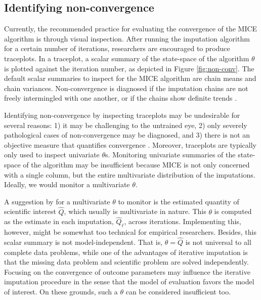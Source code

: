 \documentclass[Royal,times,sageh]{sagej}
\begin{document}
\hypertarget{identifying-non-convergence}{%
\subsection{Identifying non-convergence}\label{identifying-non-convergence}}

Currently, the recommended practice for evaluating the convergence of the MICE algorithm is through visual inspection. After running the imputation algorithm for a certain number of iterations, researchers are encouraged to produce traceplots. In a traceplot, a scalar summary of the state-space of the algorithm \(\theta\) is plotted against the iteration number, as depicted in Figure \ref{fig:non-conv}. The default scalar summaries to inspect for the MICE algorithm are chain means and chain variances. Non-convergence is diagnosed if the imputation chains are not freely intermingled with one another, or if the chains show definite trends \citep[\(\S\) 6.5.2]{buur18}.

Identifying non-convergence by inspecting traceplots may be undesirable for several reasons: 1) it may be challenging to the untrained eye, 2) only severely pathological cases of non-convergence may be diagnosed, and 3) there is not an objective measure that quantifies convergence \citep[\(\S\) 6.5.2]{buur18}. Moreover, traceplots are typically only used to inspect univariate \(\theta\)s. Monitoring univariate summaries of the state-space of the algorithm may be insufficient because MICE is not only concerned with a single column, but the entire multivariate distribution of the imputations. Ideally, we would monitor a multivariate \(\theta\).

A suggestion by \citet{buur18} for a multivariate \(\theta\) to monitor is the estimated quantity of scientific interest \(\hat{Q}\), which usually is multivariate in nature. This \(\theta\) is computed as the estimate in each imputation, \(\hat{Q}_\ell\), across iterations. Implementing this, however, might be somewhat too technical for empirical researchers. Besides, this scalar summary is not model-independent. That is, \(\theta=\hat{Q}\) is not universal to all complete data problems, while one of the advantages of iterative imputation is that the missing data problem and scientific problem are solved independently. Focusing on the convergence of outcome parameters may influence the iterative imputation procedure in the sense that the model of evaluation favors the model of interest. On these grounds, such a \(\theta\) can be considered insufficient too.
\end{document}
